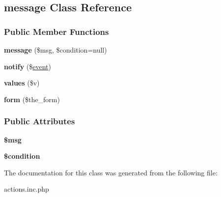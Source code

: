 \hypertarget{classmessage}{\subsection{message Class Reference}
\label{classmessage}
}
\subsubsection*{Public Member Functions}
\begin{DoxyCompactItemize}
\item 
\hypertarget{classmessage_a9c834e519b14b1a80bbae503c87c86eb}{{\bfseries message} (\$msg, \$condition=null)}\label{classmessage_a9c834e519b14b1a80bbae503c87c86eb}

\item 
\hypertarget{classmessage_af4d6453d37e1b4efb7c037b85f1817b1}{{\bfseries notify} (\$\hyperlink{classevent}{event})}\label{classmessage_af4d6453d37e1b4efb7c037b85f1817b1}

\item 
\hypertarget{classmessage_afcfe62089a61d723fa85a2c7cb2c46e6}{{\bfseries values} (\$v)}\label{classmessage_afcfe62089a61d723fa85a2c7cb2c46e6}

\item 
\hypertarget{classmessage_aa0fe8c20e66d9c62ae74c2b8139ffdc9}{{\bfseries form} (\$the\-\_\-form)}\label{classmessage_aa0fe8c20e66d9c62ae74c2b8139ffdc9}

\end{DoxyCompactItemize}
\subsubsection*{Public Attributes}
\begin{DoxyCompactItemize}
\item 
\hypertarget{classmessage_a44c174aa0f49e4b798fc1f537c2b73c5}{{\bfseries \$msg}}\label{classmessage_a44c174aa0f49e4b798fc1f537c2b73c5}

\item 
\hypertarget{classmessage_a9055b182ecf30cacc77a75676501f1fc}{{\bfseries \$condition}}\label{classmessage_a9055b182ecf30cacc77a75676501f1fc}

\end{DoxyCompactItemize}


The documentation for this class was generated from the following file\-:\begin{DoxyCompactItemize}
\item 
actions.\-inc.\-php\end{DoxyCompactItemize}
